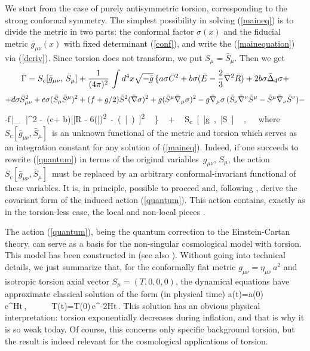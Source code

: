 We start from the case of purely antisymmetric torsion,
corresponding to the strong conformal symmetry. 
The simplest possibility in solving (\ref{maineq})
is to divide the metric in two parts: the conformal factor 
$\sigma(x)$ and the fiducial metric ${\bar g}_{\mu\nu}(x)$ with 
fixed determinant (\ref{conf}), 
and write the (\ref{mainequation}) via (\ref{deriv}).
Since torsion does not transform, we put $S_\mu = {\bar S}_\mu$. 
Then we get \cite{buodsh,book}
$$
{\bar {\Gamma}} = S_c[{\bar g}_{\mu\nu},\,{\bar S}_\mu] + 
\frac{1}{(4\pi)^2}\,
\int d^4 x\sqrt{-{\bar g}}\,\{ 
a\sigma {\bar C}^2 + b\sigma ({\bar E}-\frac23 {\bar {\nabla}}^2
{\bar R}) + 2b\sigma{\bar {\Delta}}_4\sigma +
$$$$
+ d\sigma {\bar S}_{\mu\nu}^2 + e\sigma ({\bar S}_\mu 
{\bar S}^\mu)^2+(f+g/2){\bar S}^2({\bar {\nabla}}\sigma)^2 
+ g ({\bar S}^\mu {\bar {\nabla}}_\mu\sigma)^2 
- g{\bar {\nabla}}_\mu \sigma\,({\bar S}_\nu {\bar {\nabla}}^\nu {\bar S}^\mu
-{\bar S}^\mu  {\bar {\nabla}}_\nu {\bar S}^\nu)-    
$$
\beq
-f\,{\bar \na}_\mu \si\,{\bar \na}^^2 
- \,(c+ b)[{\bar R} - 6({\bar \na}\si)^2 - 
({\bar \Box} \si)]^2\,\} \,
+\,S_c[{\bar g}_{\mu\nu},{\bar S}_\mu]\,,
\label{quantum}
\eeq
where $S_c[{\bar g}_{\mu\nu},{\bar S}_\mu]\,$ 
is an unknown functional of 
the metric and torsion which serves as an 
integration constant for any solution of (\ref{maineq}).
Indeed, if one succeeds to rewrite (\ref{quantum}) in terms 
of the original variables $\,g_{\mu\nu},\,S_\mu$, the action
$S_c[{\bar g}_{\mu\nu},{\bar S}_\mu]\,$ must be 
replaced by an arbitrary conformal-invariant functional 
of these variables. It is, in principle, possible to proceed 
and, following \cite{rei}, derive the covariant form of the 
induced action (\ref{quantum}). This action contains, 
exactly as in the torsion-less case, the local and non-local 
pieces \cite{ddi,rei}.

The action  (\ref{quantum}), 
being the quantum correction to the 
Einstein-Cartan theory, can serve as a basis for the 
non-singular cosmological model with torsion. This model 
has been constructed in \cite{buodsh} (see also \cite{book}). 
Without going into technical details, we just summarize 
that, for the 
conformally flat metric $g_{\mu\nu} = \eta_{\mu\nu}\,a^2$
and isotropic torsion axial vector $S_{\mu}=(T,0,0,0)$,
the dynamical equations have approximate classical 
solution of the form (in physical time)
\beq
a(t)=a(0)\,e^{Ht}\,,\,\,\,\,\,\,\,\,\,\,\,\,\,\,\,\,
T(t)=T(0)\,e^{-2Ht}\,.
\label{nashi_starye_dobrye_dostijenia}
\eeq
This solution has an obvious physical interpretation:
torsion exponentially decreases during inflation, and 
that is why it is so weak today. Of course, this 
concerns only specific background torsion, but the
result is indeed relevant for the cosmological 
applications of torsion. 

